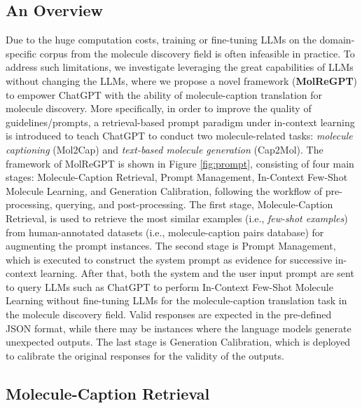 \documentclass{article}
\theoremstyle{plain}
\theoremstyle{definition}
\theoremstyle{remark}
\begin{document}
\subsection{An Overview}

Due to the huge computation costs, training or fine-tuning LLMs on the domain-specific corpus from the molecule discovery field is often infeasible in practice.
To address such limitations, we investigate leveraging the great capabilities of LLMs without changing the LLMs, where we propose a novel framework (\textbf{MolReGPT}) to empower ChatGPT with the ability of molecule-caption translation for molecule discovery. 
More specifically, in order to improve the quality of guidelines/prompts, a retrieval-based prompt paradigm under in-context learning is introduced to teach ChatGPT to conduct two molecule-related tasks: \textit{molecule captioning} (Mol2Cap) and \textit{text-based molecule generation} (Cap2Mol).
The framework of MolReGPT is shown in Figure \ref{fig:prompt}, consisting of four main stages: Molecule-Caption Retrieval, Prompt Management, In-Context Few-Shot Molecule Learning, and Generation Calibration, following the workflow of pre-processing, querying, and post-processing. The first stage, Molecule-Caption Retrieval, is used to retrieve the  most similar examples (i.e., \emph{few-shot examples}) from human-annotated datasets (i.e., molecule-caption pairs database) for augmenting the prompt instances.
The second stage is Prompt Management, which is executed to construct the system prompt as evidence for successive in-context learning.
After that, both the system and the user input prompt are sent to query LLMs such as ChatGPT to perform In-Context Few-Shot Molecule Learning without fine-tuning LLMs for the molecule-caption translation task in the molecule discovery field. 
Valid responses are expected in the pre-defined JSON format, while there may be instances where the language models generate unexpected outputs. 
The last stage is Generation Calibration, which is deployed to calibrate the original responses for the validity of the outputs.



\subsection{Molecule-Caption Retrieval}
\end{document}
